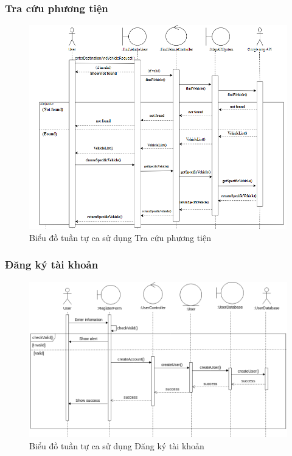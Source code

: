 \subsubsection{Tra cứu phương tiện}
\begin{figure}[H]
    \centering
    \includegraphics[width=\textwidth]{img2/2.1timphuongtien.png}
    \caption{Biểu đồ tuần tự ca sử dụng Tra cứu phương tiện}
\end{figure}

\subsubsection{Đăng ký tài khoản}
\begin{figure}[H]
    \centering
    \includegraphics[width=\textwidth]{img2/Analysis-Đăng ký.drawio.png}
    \caption{Biểu đồ tuần tự ca sử dụng Đăng ký tài khoản}
\end{figure}

